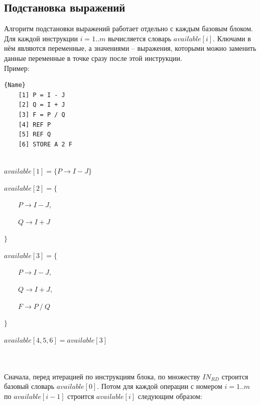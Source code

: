 \documentclass{article}
\begin{document}
\subsection{Подстановка выражений}
Алгоритм подстановки выражений работает отдельно с каждым базовым блоком. Для каждой инструкции $i = 1..m$ вычисляется словарь $available[i]$.
Ключами в нём являются переменные, а значениями -- выражения, которыми можно заменить данные переменные в точке сразу после этой инструкции.\\
Пример:\\


\begin{minipage}{.45\textwidth}
\begin{lstlisting}[frame=shadowbox]{Name}
    [1] P = I - J
    [2] Q = I + J
    [3] F = P / Q
    [4] REF P
    [5] REF Q
    [6] STORE A 2 F
  
\end{lstlisting}
\end{minipage}\hfill
\begin{minipage}{.43\textwidth}
    $available[1] = \{ P \rightarrow I - J \}$

    $available[2] = \{ $
        
        $\qquad P \rightarrow I - J, $
        
        $\qquad Q \rightarrow I + J$

    $\}$

    $available[3] = \{$
        
        $\qquad P \rightarrow I - J, $
        
        $\qquad Q \rightarrow I + J,$

        $\qquad F \rightarrow P\ /\ Q\ $

    $\}$


    $available[4, 5, 6] = available[3]$

\end{minipage}\\\\


Сначала, перед итерацией по инструкциям блока, по множеству $IN_{RD}$ строится базовый словарь $available[0]$. Потом для каждой операции с номером $i = 1..m$ по $available[i-1]$ строится $available[i]$ следующим образом:
\end{document}
